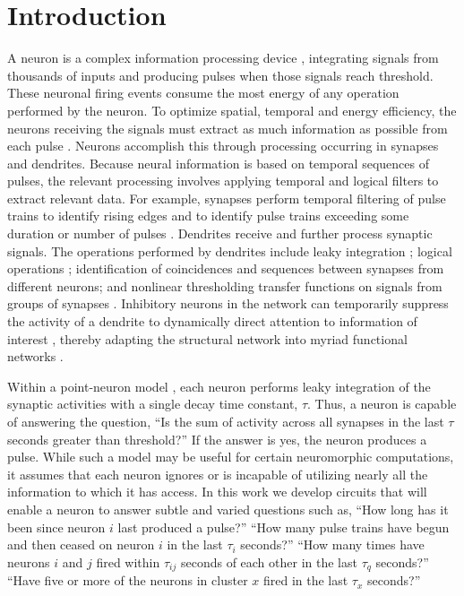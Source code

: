 \documentclass[twocolumn]{article}
\begin{document}
\section{\label{sec:introduction}Introduction}
A neuron is a complex information processing device \cite{ko1997}, integrating signals from thousands of inputs and producing pulses when those signals reach threshold. These neuronal firing events consume the most energy of any operation performed by the neuron. To optimize spatial, temporal and energy efficiency, the neurons receiving the signals must extract as much information as possible from each pulse \cite{lase2003}. Neurons accomplish this through processing occurring in synapses and dendrites. Because neural information is based on temporal sequences of pulses, the relevant processing involves applying temporal and logical filters to extract relevant data. For example, synapses perform temporal filtering of pulse trains to identify rising edges and to identify pulse trains exceeding some duration or number of pulses \cite{abre2004}. Dendrites receive and further process synaptic signals. The operations performed by dendrites include leaky integration \cite{geki2002}; logical operations \cite{stsp2015}; identification of coincidences \cite{stsp2015} and sequences \cite{stse2007,haah2015} between synapses from different neurons; and nonlinear thresholding transfer functions on signals from groups of synapses \cite{sava2017}. Inhibitory neurons in the network can temporarily suppress the activity of a dendrite to dynamically direct attention to information of interest \cite{enfr2001}, thereby adapting the structural network into myriad functional networks \cite{brme2010}.

Within a point-neuron model \cite{geki2002}, each neuron performs leaky integration of the synaptic activities with a single decay time constant, $\tau$. Thus, a neuron is capable of answering the question, ``Is the sum of activity across all synapses in the last $\tau$ seconds greater than threshold?'' If the answer is yes, the neuron produces a pulse. While such a model may be useful for certain neuromorphic computations, it assumes that each neuron ignores or is incapable of utilizing nearly all the information to which it has access. In this work we develop circuits that will enable a neuron to answer subtle and varied questions such as, ``How long has it been since neuron $i$ last produced a pulse?'' ``How many pulse trains have begun and then ceased on neuron $i$ in the last $\tau_i$ seconds?'' ``How many times have neurons $i$ and $j$ fired within $\tau_{ij}$ seconds of each other in the last $\tau_q$ seconds?'' ``Have five or more of the neurons in cluster $x$ fired in the last $\tau_x$ seconds?''
\end{document}
